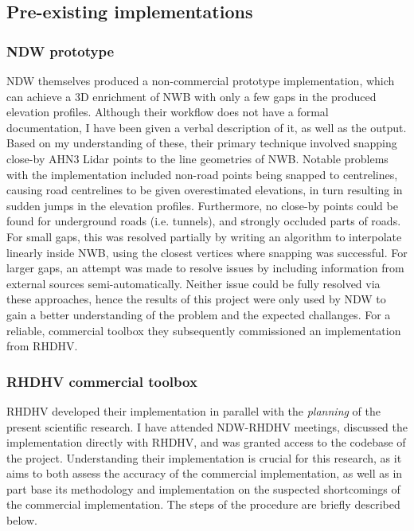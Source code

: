 \subsection{Pre-existing implementations}
\label{sub:premethods}
\subsubsection*{NDW prototype}

NDW themselves produced a non-commercial prototype implementation, which can achieve a 3D enrichment of NWB with only a few gaps in the produced elevation profiles. Although their workflow does not have a formal documentation, I have been given a verbal description of it, as well as the output. Based on my understanding of these, their primary technique involved snapping close-by AHN3 Lidar points to the line geometries of NWB. Notable problems with the implementation included non-road points being snapped to centrelines, causing road centrelines to be given overestimated elevations, in turn resulting in sudden jumps in the elevation profiles. Furthermore, no close-by points could be found for underground roads (i.e. tunnels), and strongly occluded parts of roads. For small gaps, this was resolved partially by writing an algorithm to interpolate linearly inside NWB, using the closest vertices where snapping was successful. For larger gaps, an attempt was made to resolve issues by including information from external sources semi-automatically. Neither issue could be fully resolved via these approaches, hence the results of this project were only used by NDW to gain a better understanding of the problem and the expected challanges. For a reliable, commercial toolbox they subsequently commissioned an implementation from RHDHV.

\subsubsection*{RHDHV commercial toolbox}

RHDHV developed their implementation in parallel with the \textit{planning} of the present scientific research. I have attended NDW-RHDHV meetings, discussed the implementation directly with RHDHV, and was granted access to the codebase of the project. Understanding their implementation is crucial for this research, as it aims to both assess the accuracy of the commercial implementation, as well as in part base its methodology and implementation on the suspected shortcomings of the commercial implementation. The steps of the procedure are briefly described below.

